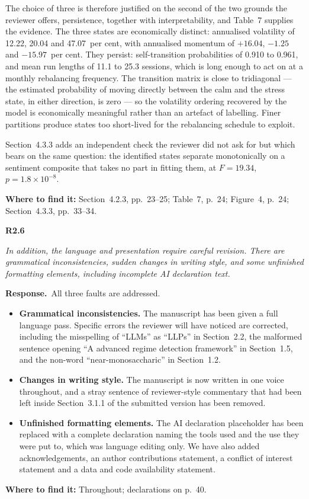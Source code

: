 \documentclass[11pt,a4paper]{article}
\newcommand{\rc}[2]{%
  \par\medskip\noindent
  \colorbox{qbg}{\parbox{\dimexpr\linewidth-2\fboxsep}{%
  \textbf{#1}\par\smallskip\itshape #2}}\par\nopagebreak}
\newcommand{\resp}{\par\medskip\noindent\textbf{Response.}\ }
\newcommand{\where}[1]{\par\smallskip\noindent\textcolor{blue!55!black}{\textbf{Where to find it:} #1}\par}
\begin{document}
The choice of three is therefore justified on the second of the two grounds the reviewer
offers, persistence, together with interpretability, and Table~7 supplies the evidence. The
three states are economically distinct: annualised volatility of 12.22, 20.04 and
47.07~per cent, with annualised momentum of $+16.04$, $-1.25$ and $-15.97$~per cent. They
persist: self-transition probabilities of 0.910 to 0.961, and mean run lengths of 11.1 to
25.3 sessions, which is long enough to act on at a monthly rebalancing frequency. The
transition matrix is close to tridiagonal --- the estimated probability of moving directly
between the calm and the stress state, in either direction, is zero --- so the volatility
ordering recovered by the model is economically meaningful rather than an artefact of
labelling. Finer partitions produce states too short-lived for the rebalancing schedule to
exploit.

Section~4.3.3 adds an independent check the reviewer did not ask for but which bears on the
same question: the identified states separate monotonically on a sentiment composite that
takes no part in fitting them, at $F = 19.34$, $p = 1.8 \times 10^{-8}$.
\where{Section~4.2.3, pp.~23--25; Table~7, p.~24; Figure~4, p.~24; Section~4.3.3,
pp.~33--34.}

\rc{R2.6}{In addition, the language and presentation require careful revision. There are
grammatical inconsistencies, sudden changes in writing style, and some unfinished
formatting elements, including incomplete AI declaration text.}

\resp All three faults are addressed.

\begin{itemize}
\item \textbf{Grammatical inconsistencies.} The manuscript has been given a full language
pass. Specific errors the reviewer will have noticed are corrected, including the
misspelling of ``LLMs'' as ``LLPs'' in Section~2.2, the malformed sentence opening
``A advanced regime detection framework'' in Section~1.5, and the non-word
``near-monosaccharic'' in Section~1.2.
\item \textbf{Changes in writing style.} The manuscript is now written in one voice
throughout, and a stray sentence of reviewer-style commentary that had been left inside
Section~3.1.1 of the submitted version has been removed.
\item \textbf{Unfinished formatting elements.} The AI declaration placeholder has been
replaced with a complete declaration naming the tools used and the use they were put to,
which was language editing only. We have also added acknowledgements, an author
contributions statement, a conflict of interest statement and a data and code availability
statement.
\end{itemize}
\where{Throughout; declarations on p.~40.}
\end{document}
